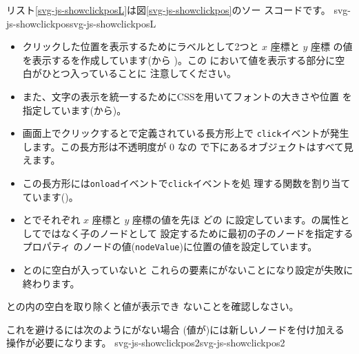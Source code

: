 リスト\ref{svg-js-showclickposL}は図\ref{svg-js-showclickpos}のソー
スコードです。
{svg-js-showclickpos}{svg-js-showclickposL}
\begin{itemize}
 \item クリックした位置を表示するためにラベルとして2つと $x$ 座標と $y$ 座標
       の値を表示するを作成しています(から
       )。この
       において値を表示する部分に空白がひとつ入っていることに
       注意してください。\label{NoteTextNode}
 \item また、文字の表示を統一するためにCSSを用いてフォントの大きさや位置
       を指定しています(から)。
 \item 画面上でクリックするとで定義されている長方形上で
       \texttt{click}イベントが発生します。この長方形は不透明度が $0$ なの
       で下にあるオブジェクトはすべて見えます。
 \item この長方形には\texttt{onload}イベントで\texttt{click}イベントを処
       理する関数を割り当てています()。
 \item {}とでそれぞれ $x$ 座標と $y$ 座標の値を先ほ
       どの
       に設定しています。の属性としてではなく子のノードとして
       設定するために最初の子のノードを指定するプロパティ
       のノードの値(\texttt{nodeValue})に位置の値を設定しています。
 \item {}とのに空白が入っていないと
       これらの要素にがないことになり設定が失敗に終わります。
\label{nofirstChild}
\end{itemize}
\begin{Problem}\upshape
 との内の空白を取り除くと値が表示でき
 ないことを確認しなさい。
\end{Problem}
これを避けるには次のようにがない場合
(値が)には新しいノードを付け加える操作が必要になります。
{svg-js-showclickpos2}{svg-js-showclickpos2}
